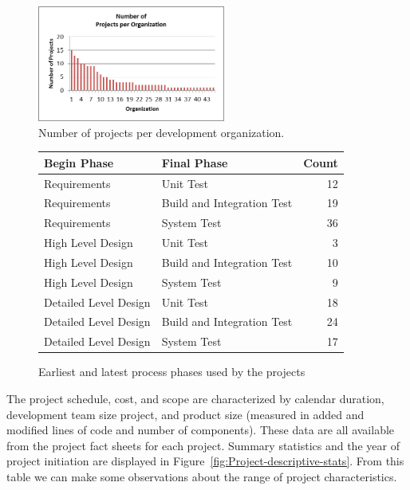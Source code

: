 \documentclass[smallcondensed]{svjour3}
\begin{document}
 
\begin{figure}[!t] 
\begin{center}
\includegraphics[height=1.5in]{number_of_projects_per_org.png}
\end{center} 
\caption{Number of projects per development organization.}
\label{fig:number of projects per organization}
\end{figure}


 
 
 \begin{figure}[ht]
\scriptsize
\centering
\begin{tabular}{llr} 
 Begin Phase &  Final Phase & Count  \\\hline
  Requirements      & Unit Test                   & 12  \\ 
  Requirements      & Build and Integration Test  & 19  \\ 
  Requirements      & System Test                 & 36  \\ 
  High Level Design & Unit Test                   & 3  \\ 
  High Level Design & Build and Integration Test  & 10  \\ 
  High Level Design & System Test                 & 9  \\ 
  Detailed Level Design & Unit Test                   & 18  \\ 
  Detailed Level Design & Build and Integration Test  & 24  \\ 
  Detailed Level Design & System Test                 & 17  \\ 
\end{tabular}
\caption{Earliest and latest process phases used by the projects}
\label{fig:earliest-and-least-process-phases}
\end{figure}
 


 
 The project schedule, cost, and scope  are characterized by calendar duration, development team size project, and product size (measured in added and modified lines of code and number of components).  These data are all available from the project fact sheets for each project. Summary statistics and the year of project initiation are displayed in Figure~\ref{fig:Project-descriptive-stats}. From this table we can make some observations about the range of project characteristics.
 
\end{document}
